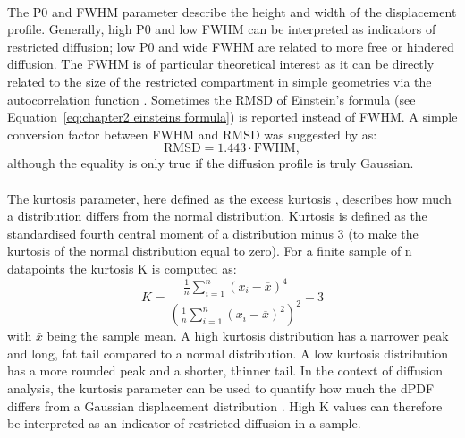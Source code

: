\paragraph{}
The P0 and FWHM parameter describe the height and width of the displacement profile. Generally, high P0 and low FWHM can be interpreted as indicators of restricted diffusion; low P0 and wide FWHM are related to more free or hindered diffusion. The FWHM is of particular theoretical interest as it can be directly related to the size of the restricted compartment in simple geometries via the autocorrelation function \citep{Cory:1990,Kuchel:1997}. Sometimes the \gls{RMSD} of Einstein's formula (see Equation~\ref{eq:chapter2 einsteins formula}) is reported instead of FWHM. A simple conversion factor between FWHM and RMSD was suggested by \citet{Cory:1990} as:
\begin{equation}
	\mbox{RMSD} = 1.443 \cdot \mbox{FWHM},
\end{equation}
although the equality is only true if the diffusion profile is truly Gaussian.
\paragraph{}
The kurtosis parameter, here defined as the excess kurtosis \citep{Kenney:1957}, describes how much a distribution differs from the normal distribution. Kurtosis is defined as the standardised fourth central moment of a distribution minus 3 (to make the kurtosis of the normal distribution equal to zero). For a finite sample of n datapoints the kurtosis K is computed as:
\begin{equation}
	K=\frac{\tfrac{1}{n} \sum_{i=1}^n (x_i - \overline{x})^4}{\left(\tfrac{1}{n} \sum_{i=1}^n (x_i - \overline{x})^2\right)^2} - 3 
\end{equation}
with $\bar{x}$ being the sample mean. A high kurtosis distribution has a narrower peak and long, fat tail compared to a normal distribution. A low kurtosis distribution has a more rounded peak and a shorter, thinner tail. In the context of diffusion analysis, the kurtosis parameter can be used to quantify how much the dPDF differs from a Gaussian displacement distribution \citep{Jensen:2010}. High K values can therefore be interpreted as an indicator of restricted diffusion in a sample.

